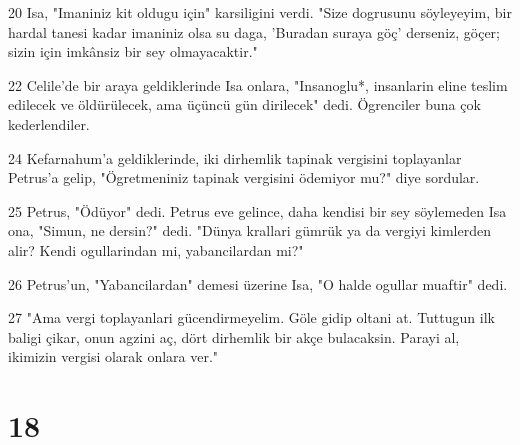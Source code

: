\par 20 Isa, "Imaniniz kit oldugu için" karsiligini verdi. "Size dogrusunu söyleyeyim, bir hardal tanesi kadar imaniniz olsa su daga, 'Buradan suraya göç' derseniz, göçer; sizin için imkânsiz bir sey olmayacaktir."
\par 22 Celile'de bir araya geldiklerinde Isa onlara, "Insanoglu*, insanlarin eline teslim edilecek ve öldürülecek, ama üçüncü gün dirilecek" dedi. Ögrenciler buna çok kederlendiler.
\par 24 Kefarnahum'a geldiklerinde, iki dirhemlik tapinak vergisini toplayanlar Petrus'a gelip, "Ögretmeniniz tapinak vergisini ödemiyor mu?" diye sordular.
\par 25 Petrus, "Ödüyor" dedi. Petrus eve gelince, daha kendisi bir sey söylemeden Isa ona, "Simun, ne dersin?" dedi. "Dünya krallari gümrük ya da vergiyi kimlerden alir? Kendi ogullarindan mi, yabancilardan mi?"
\par 26 Petrus'un, "Yabancilardan" demesi üzerine Isa, "O halde ogullar muaftir" dedi.
\par 27 "Ama vergi toplayanlari gücendirmeyelim. Göle gidip oltani at. Tuttugun ilk baligi çikar, onun agzini aç, dört dirhemlik bir akçe bulacaksin. Parayi al, ikimizin vergisi olarak onlara ver."

\chapter{18}

